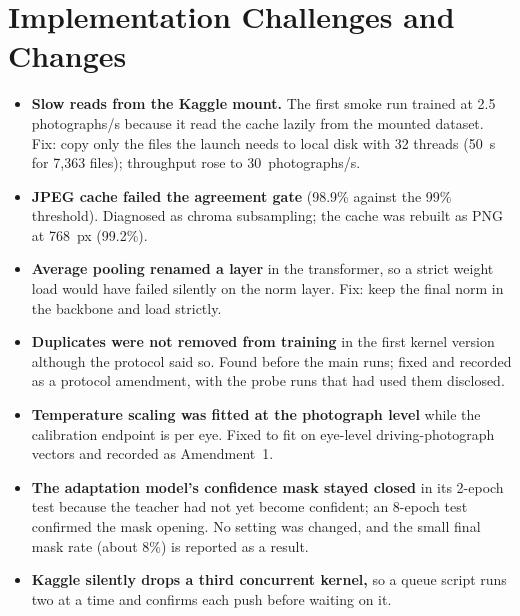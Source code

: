 \section{Implementation Challenges and Changes}\label{sec:challenges}
\begin{itemize}
\item \textbf{Slow reads from the Kaggle mount.} The first smoke run trained at 2.5 photographs/s because it read the cache lazily from the mounted dataset. Fix: copy only the files the launch needs to local disk with 32 threads (50~s for 7{,}363 files); throughput rose to 30~photographs/s.
\item \textbf{JPEG cache failed the agreement gate} (98.9\% against the 99\% threshold). Diagnosed as chroma subsampling; the cache was rebuilt as PNG at 768~px (99.2\%).
\item \textbf{Average pooling renamed a layer} in the transformer, so a strict weight load would have failed silently on the norm layer. Fix: keep the final norm in the backbone and load strictly.
\item \textbf{Duplicates were not removed from training} in the first kernel version although the protocol said so. Found before the main runs; fixed and recorded as a protocol amendment, with the probe runs that had used them disclosed.
\item \textbf{Temperature scaling was fitted at the photograph level} while the calibration endpoint is per eye. Fixed to fit on eye-level driving-photograph vectors and recorded as Amendment~1.
\item \textbf{The adaptation model's confidence mask stayed closed} in its 2-epoch test because the teacher had not yet become confident; an 8-epoch test confirmed the mask opening. No setting was changed, and the small final mask rate (about 8\%) is reported as a result.
\item \textbf{Kaggle silently drops a third concurrent kernel,} so a queue script runs two at a time and confirms each push before waiting on it.
\end{itemize}

